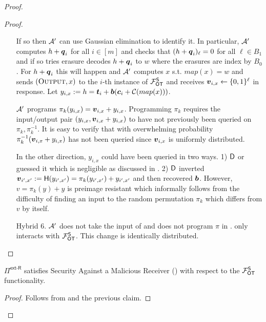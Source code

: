 \begin{proof}
\begin{proof}
\begin{enumerate}[leftmargin=1.8cm]
			
			If so then $\mathcal{A}'$ can use Gaussian elimination to identify it. In particular, $\mathcal{A}'$ computes $h+\boldsymbol{q}_i$ for all $i\in[m]$ and checks that $(h+\boldsymbol{q}_i)_\ell =0$ for all $\ell\in B_1$ and if so tries erasure decodes $h+\boldsymbol{q}_i$ to $w$ where the erasures are index by $B_0$. For $h+\boldsymbol{q}_i$ this will happen and $\mathcal{A}'$ computes $x$ s.t. $map(x)=w$ and sends $(\textsc{Output}, x)$ to the $i$-th instance of $\mathcal{F}_{\mathsf{OT}}^\mathsf{S}$ and receives $\boldsymbol{v}_{i,x}\gets\{0,1\}^\ell$ in response.  Let $y_{i,x}:=h=\boldsymbol{t}_i + \boldsymbol{b} (\boldsymbol{c}_i + \mathcal{C}(map(x)))$.
			
			$\mathcal{A}'$ programs $\pi_k(y_{i,x})=\boldsymbol{v}_{i,x}+y_{i,x}$. Programming $\pi_k$ requires the input/output pair $(y_{i,x},\boldsymbol{v}_{i,x}+y_{i,x})$ to have not previously been queried on $\pi_k,\pi_k^{-1}$.  It is easy to verify that with overwhelming probability $\pi_k^{-1}(\boldsymbol{v}_{i,x}+y_{i,x})$ has not been queried since $\boldsymbol{v}_{i,x}$ is uniformly distributed. 
			
			In the other direction, $y_{i,x}$  could have been queried in two ways. 1) $\mathsf D$ or \Adv guessed it which is negligible as discussed in . 2) $\mathsf D$ inverted $\boldsymbol{v}_{i',x'}:=\mathsf{H}(y_{i',x'})=\pi_k(y_{i',x'})+y_{i',x'}$ and then recovered $\boldsymbol{b}$. However, $v=\pi_k(y)+y$ is preimage resistant\cite{C:BlaRogShr02,SP:Winternitz} which informally follows from the difficulty of finding an input to the random permutation $\pi_k$ which differs from $v$ by itself.
			
			\item[Hybrid 6.] $\mathcal{A}'$ does not take the input of \send and does not program $\pi$ in . \send only interacts with $\mathcal{F}_{\mathsf{OT}}^\mathsf{S}$. This change is identically distributed.
		\end{enumerate} 
		\pe
	\end{proof}


	\begin{claim}\label{claim:ext-R-S-MalReceiver2}
		$\Pi^{\textsf{ext-R}}$ satisfies Security Against a Malicious Receiver () with respect to the $\mathcal{F}_{\mathsf{OT}}^\mathsf{S}$ functionality.
	\end{claim}
	\begin{proof}
		Follows from  and the previous claim.
		\pe
	\end{proof}
	\pe
\end{proof}